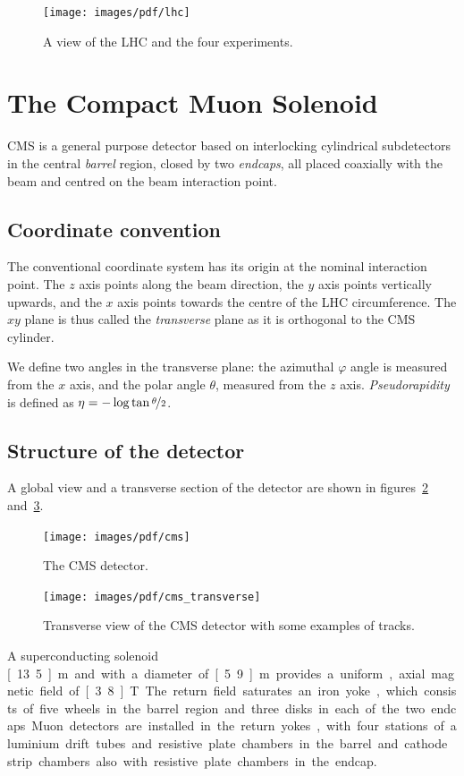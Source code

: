 \begin{figure}[htb]
    \centering
    \texttt{[image: images/pdf/lhc]}

    \caption{A view of the LHC and the four experiments.}
    \label{fig:lhc}
\end{figure}

\section{The Compact Muon Solenoid}
CMS is a general purpose detector based on interlocking cylindrical
subdetectors in the central \emph{barrel} region, closed by two
\emph{endcaps}, all placed coaxially with the beam and centred on the beam interaction point.
\subsection{Coordinate convention}
The conventional coordinate system has its origin at the nominal interaction
point. The $z$ axis points along the beam direction, the $y$ axis points
vertically upwards, and the $x$ axis points towards the centre of the LHC
circumference. The $xy$ plane is thus called the \emph{transverse} plane as
it is orthogonal to the CMS cylinder.

We define two angles in the transverse plane: the azimuthal $\varphi$ angle
is measured from the $x$ axis, and the polar angle $\theta$, measured from
the $z$ axis.
\emph{Pseudorapidity} is defined as $\eta = -\log \tan
\nicefrac{\theta}{2}$.

\subsection{Structure of the detector}
A global view and a transverse section of the detector are shown in
figures~\ref{fig:cms} and~\ref{fig:cms_transverse}.

\begin{figure}[htb]
    \centering
    \texttt{[image: images/pdf/cms]}
    \caption{The CMS detector.}
    \label{fig:cms}
\end{figure}

\begin{figure}[htb]
    \centering
    \texttt{[image: images/pdf/cms\_transverse]}
    \caption{Transverse view of the CMS detector with some examples of tracks.}
    \label{fig:cms_transverse}
\end{figure}

A superconducting solenoid \unit[13.5]{m} and with a diameter of
\unit[5.9]{m} provides a uniform, axial magnetic field of \unit[3.8]{T}.
The return field saturates an iron yoke, which consists of five wheels in
the barrel region and three disks in each of the two endcaps.
Muon detectors are installed in the return yokes, with four stations of
aluminium drift tubes and resistive plate chambers in the barrel and cathode
strip chambers also with
resistive plate chambers in the endcap.

